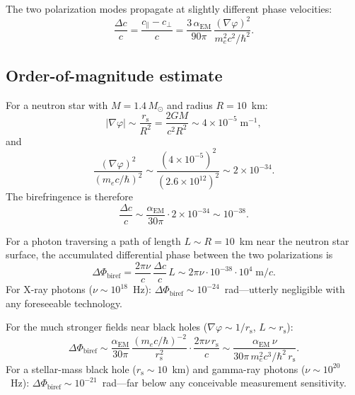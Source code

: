 \documentclass[aps,prd,onecolumn,superscriptaddress,nofootinbib,showpacs,12pt,notitlepage]{revtex4-2}
\newcommand{\rs}{r_{\mathrm{s}}}
\begin{document}
The two polarization modes propagate at slightly
different phase velocities:
\begin{equation}\label{eq:delta_c}
  \frac{\Delta c}{c}
  = \frac{c_{\parallel} - c_{\perp}}{c}
  = \frac{3\,\alpha_{\mathrm{EM}}}{90\pi}\,
    \frac{(\nabla\varphi)^{2}}{m_e^{2}c^{2}/\hbar^{2}}.
\end{equation}

\subsection{Order-of-magnitude estimate}
\label{sec:biref_estimate}

For a neutron star with $M = 1.4\,M_\odot$ and radius
$R = 10$~km:
\begin{equation}
  |\nabla\varphi|
  \sim \frac{\rs}{R^{2}}
  = \frac{2GM}{c^{2}R^{2}}
  \sim 4 \times 10^{-5}\;\mathrm{m^{-1}},
\end{equation}
and
\begin{equation}
  \frac{(\nabla\varphi)^{2}}
    {(m_e c/\hbar)^{2}}
  \sim \frac{(4 \times 10^{-5})^{2}}
    {(2.6 \times 10^{12})^{2}}
  \sim 2 \times 10^{-34}.
\end{equation}
The birefringence is therefore
\begin{equation}\label{eq:biref_NS}
  \frac{\Delta c}{c}
  \sim \frac{\alpha_{\mathrm{EM}}}{30\pi}
    \cdot 2 \times 10^{-34}
  \sim 10^{-38}.
\end{equation}

For a photon traversing a path of length $L \sim R = 10$~km
near the neutron star surface, the accumulated differential
phase between the two polarizations is
\begin{equation}\label{eq:biref_phase}
  \Delta\Phi_{\mathrm{biref}}
  = \frac{2\pi\nu}{c}\,\frac{\Delta c}{c}\,L
  \sim 2\pi\nu \cdot 10^{-38} \cdot 10^{4}\;\mathrm{m}/c.
\end{equation}
For X-ray photons ($\nu \sim 10^{18}$~Hz):
$\Delta\Phi_{\mathrm{biref}} \sim 10^{-24}$~rad---utterly
negligible with any foreseeable technology.

For the much stronger fields near black holes
($\nabla\varphi \sim 1/\rs$, $L \sim \rs$):
\begin{equation}\label{eq:biref_BH}
  \Delta\Phi_{\mathrm{biref}}
  \sim \frac{\alpha_{\mathrm{EM}}}{30\pi}\,
    \frac{(m_e c/\hbar)^{-2}}{\rs^{2}}\cdot
    \frac{2\pi\nu\,\rs}{c}
  \sim \frac{\alpha_{\mathrm{EM}}\,\nu}
    {30\pi\,m_e^{2}c^{3}/\hbar^{2}\,\rs}.
\end{equation}
For a stellar-mass black hole ($\rs \sim 10$~km) and
gamma-ray photons ($\nu \sim 10^{20}$~Hz):
$\Delta\Phi_{\mathrm{biref}} \sim 10^{-21}$~rad---far
below any conceivable measurement sensitivity.
\end{document}
